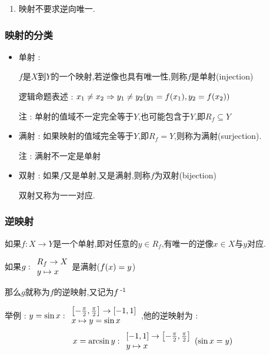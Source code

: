 {{{\begin{enumerate}
{              但是可以稍作改造:对$Y = \mathRealNumberCollection$做限制,令$Y = R^-$,此时 : $$
                  \mapsToWithSubText{f}{X \to Y}{x \mapsto y}(y^2 = x)
              $$
              就构成了一个映射
              }
        \item {
              映射不要求逆向唯一.
              }
    \end{enumerate}
}%

\subsubsection{映射的分类}{
    \begin{itemize}
        \item {
              单射 :

              $f$是$X$到$Y$的一个映射,若逆像也具有唯一性,则称$f$是单射(injection)

              逻辑命题表述 : $x_1 \neq x_2 \Rightarrow y_1 \neq y_2(y_1 = f(x_1),y_2 = f(x_2))$

              注 : 单射的值域不一定完全等于$Y$,也可能包含于$Y$,即$R_f \subseteq Y$
              }
        \item {
              满射 : 如果映射的值域完全等于$Y$,即$R_f = Y$,则称为满射(surjection).

              注 : 满射不一定是单射
              }
        \item {
              双射 : 如果$f$又是单射,又是满射,则称$f$为双射(bijection)

              双射又称为一一对应.
              }
    \end{itemize}
}%

\subsubsection{逆映射}{
    如果$f : X \to Y$是一个单射,即对任意的$y \in R_f$,有唯一的逆像$x \in X$与$y$对应.

    如果$g : \begin{array}{l} R_f \to X \\ y \mapsto x \end{array}$是满射($f(x) = y$)

    那么$g$就称为$f$的逆映射,又记为$f\operatorname{^{-1}}$

    举例 : $y = \sin x : \begin{array}{l} \left[-\frac{\pi}{2},\frac{\pi}{2}\right] \to \left[-1,1\right] \\ x \mapsto y = \sin x \end{array}$,他的逆映射为 : $$
        x = \arcsin y : \begin{array}{l} \left[-1,1\right] \to \left[-\frac{\pi}{2},\frac{\pi}{2}\right] \\ y \mapsto x \end{array}(\sin x = y)
    $$
}%

}}
